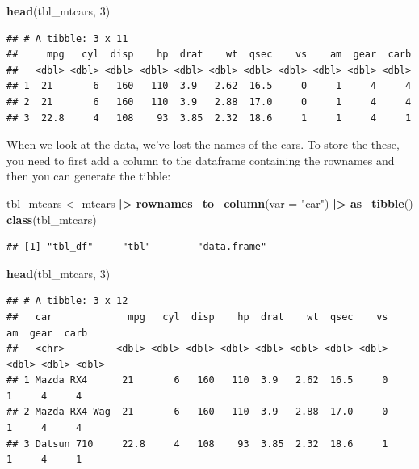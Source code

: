 \documentclass[
  12pt,
  oneside]{book}
\newenvironment{Shaded}{\begin{snugshade}}{\end{snugshade}}
\newcommand{\AttributeTok}[1]{\textcolor[rgb]{0.13,0.29,0.53}{#1}}
\newcommand{\DecValTok}[1]{\textcolor[rgb]{0.00,0.00,0.81}{#1}}
\newcommand{\FunctionTok}[1]{\textcolor[rgb]{0.13,0.29,0.53}{\textbf{#1}}}
\newcommand{\NormalTok}[1]{#1}
\newcommand{\OtherTok}[1]{\textcolor[rgb]{0.56,0.35,0.01}{#1}}
\newcommand{\SpecialCharTok}[1]{\textcolor[rgb]{0.81,0.36,0.00}{\textbf{#1}}}
\newcommand{\StringTok}[1]{\textcolor[rgb]{0.31,0.60,0.02}{#1}}
\begin{document}
\begin{Shaded}
\begin{Highlighting}[]
\FunctionTok{head}\NormalTok{(tbl\_mtcars, }\DecValTok{3}\NormalTok{)}
\end{Highlighting}
\end{Shaded}

\begin{verbatim}
## # A tibble: 3 x 11
##     mpg   cyl  disp    hp  drat    wt  qsec    vs    am  gear  carb
##   <dbl> <dbl> <dbl> <dbl> <dbl> <dbl> <dbl> <dbl> <dbl> <dbl> <dbl>
## 1  21       6   160   110  3.9   2.62  16.5     0     1     4     4
## 2  21       6   160   110  3.9   2.88  17.0     0     1     4     4
## 3  22.8     4   108    93  3.85  2.32  18.6     1     1     4     1
\end{verbatim}

When we look at the data, we've lost the names of the cars. To store the these, you need to first add a column to the dataframe containing the rownames and then you can generate the tibble:

\begin{Shaded}
\begin{Highlighting}[]
\NormalTok{tbl\_mtcars }\OtherTok{\textless{}{-}}\NormalTok{ mtcars }\SpecialCharTok{|\textgreater{}} 
  \FunctionTok{rownames\_to\_column}\NormalTok{(}\AttributeTok{var =} \StringTok{"car"}\NormalTok{) }\SpecialCharTok{|\textgreater{}}
  \FunctionTok{as\_tibble}\NormalTok{() }
\FunctionTok{class}\NormalTok{(tbl\_mtcars)}
\end{Highlighting}
\end{Shaded}

\begin{verbatim}
## [1] "tbl_df"     "tbl"        "data.frame"
\end{verbatim}

\begin{Shaded}
\begin{Highlighting}[]
\FunctionTok{head}\NormalTok{(tbl\_mtcars, }\DecValTok{3}\NormalTok{)}
\end{Highlighting}
\end{Shaded}

\begin{verbatim}
## # A tibble: 3 x 12
##   car             mpg   cyl  disp    hp  drat    wt  qsec    vs    am  gear  carb
##   <chr>         <dbl> <dbl> <dbl> <dbl> <dbl> <dbl> <dbl> <dbl> <dbl> <dbl> <dbl>
## 1 Mazda RX4      21       6   160   110  3.9   2.62  16.5     0     1     4     4
## 2 Mazda RX4 Wag  21       6   160   110  3.9   2.88  17.0     0     1     4     4
## 3 Datsun 710     22.8     4   108    93  3.85  2.32  18.6     1     1     4     1
\end{verbatim}
\end{document}

